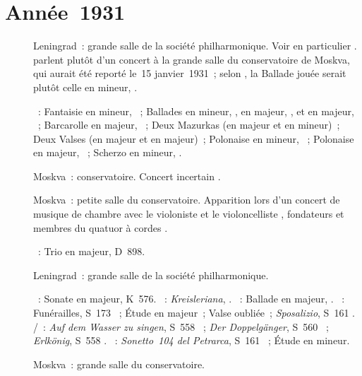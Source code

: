 \section{Année~1931}

\begin{description}
 \item[]
 Leningrad~: grande salle de la société philharmonique.
 Voir en particulier \citet[p.~444]{Milshteyn82a}.
 \citet[p.~402]{Scriabine} parlent plutôt d'un concert à la grande salle du
 conservatoire de Moskva, qui aurait été reporté le~15 janvier~1931~; selon
 \citeauthor{Scriabine}, la Ballade jouée serait plutôt celle en \kF mineur,
 .

 \textsc{\Chopin{}}~: Fantaisie en \kF mineur, ~; Ballades en \kG
 mineur, , en \kF majeur, , et en \kA \Flat majeur,
 ~; Barcarolle en \kF \Sharp majeur, ~; Deux Mazurkas (en
 \kC majeur et en \kA mineur)~; Deux Valses (en \kA \Flat majeur et en \kD
 \Flat majeur)~; Polonaise en \kF \Sharp mineur, ~; Polonaise en
 \kA \Flat majeur, ~; Scherzo en \kB mineur, .
 \item[]
 Moskva~: conservatoire.
 Concert incertain \citep[p.~402]{Scriabine}.
 \item[]
 Moskva~: petite salle du conservatoire.
 Apparition lors d'un concert de musique de chambre avec le violoniste
 \DTziganov{} et le violoncelliste \SShirinsky{}, fondateurs et membres du
 quatuor à cordes \Beethoven{}.

 \textsc{\Schubert{}}~: Trio en \kB \Flat majeur, D~898.
 \item[]
 Leningrad~: grande salle de la société philharmonique.

 \textsc{\Mozart{}}~: Sonate en \kD majeur, K~576.
 \textsc{\Schumann{}}~: \emph{Kreisleriana}, .
 \textsc{\Chopin{}}~: Ballade  en \kA \Flat majeur, .
 \textsc{\Liszt{}}~: Funérailles, S~173 ~; Étude en \kB \Flat
 majeur~; Valse oubliée~; \emph{Sposalizio}, S~161 .
 \textsc{\Schubert{}/\Liszt{}}~: \emph{Auf dem Wasser zu singen}, S~558
 ~; \emph{Der Doppelgänger}, S~560 ~; \emph{Erlkönig},
 S~558 .
 \textsc{\Liszt{}}~: \emph{Sonetto~104 del Petrarca}, S~161 ~;
 Étude en \kF mineur.
 \item[]
 Moskva~: grande salle du conservatoire.


\end{description}

